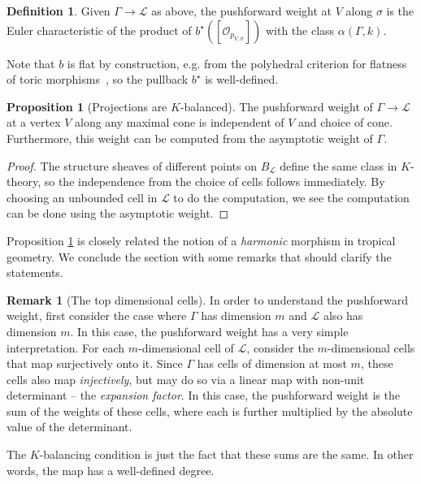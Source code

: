 \documentclass[11pt]{amsart}
\theoremstyle{definition}
\theoremstyle{definition}
\newtheorem{proposition}[theorem]{Proposition}
\newtheorem{remark}[theorem]{Remark}
\newtheorem{definition}[theorem]{Definition}
\begin{document}
\begin{definition}
Given $\Gamma\to\mathcal L$ as above, the pushforward weight at $V$ along $\sigma$ is the Euler characteristic of the product of $b^{\star}([\mathcal O_{p_{V,\sigma}}])$ with the class $\alpha(\Gamma,k)$. 
\end{definition}

Note that $b$ is flat by construction, e.g. from the polyhedral criterion for flatness of toric morphisms~\cite[Section~4]{AbramovichKaru}, so the pullback $b^\star$ is well-defined. 

\begin{proposition}[Projections are $K$-balanced]\label{prop: pushforwards}
The pushforward weight of $\Gamma\to\mathcal L$ at a vertex $V$ along any maximal cone is independent of $V$ and choice of cone. Furthermore, this weight can be computed from the asymptotic weight of $\Gamma$. 
\end{proposition}

\begin{proof}
The structure sheaves of different points on $B_\mathcal L$ define the same class in $K$-theory, so the independence from the choice of cells follows immediately. By choosing an unbounded cell in $\mathcal L$ to do the computation, we see the computation can be done using the asymptotic weight. 
\end{proof}

Proposition \ref{prop: pushforwards} is closely related the notion of a {\it harmonic} morphism in tropical geometry. We conclude the section with some remarks that should clarify the statements.

\begin{remark}[The top dimensional cells]
In order to understand the pushforward weight, first consider the case where $\Gamma$ has dimension $m$ and $\mathcal L$ also has dimension $m$. In this case, the pushforward weight has a very simple interpretation. For each $m$-dimensional cell of $\mathcal L$, consider the $m$-dimensional cells that map surjectively onto it. Since $\Gamma$ has cells of dimension at most $m$, these cells also map {\it injectively}, but may do so via a linear map with non-unit determinant -- the {\it expansion factor}. In this case, the pushforward weight is the sum of the weights of these cells, where each is further multiplied by the absolute value of the determinant. 

The $K$-balancing condition is just the fact that these sums are the same. In other words, the map has a well-defined degree. 
\end{remark}
\end{document}
